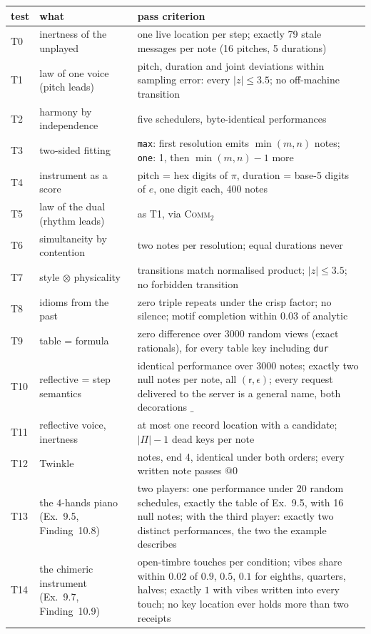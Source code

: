 \documentclass[11pt,a4paper]{article}
\theoremstyle{definition}
\theoremstyle{remark}
\newcommand{\Pit}{\Pi}
\newcommand{\nulld}{\epsilon}
\newcommand{\rest}{\mathsf{r}}
\newcommand{\wild}{\_}
\begin{document}
\begin{center}
\small
\begin{tabular}{@{}l>{\raggedright\arraybackslash}p{4.9cm}>{\raggedright\arraybackslash}p{5.6cm}@{}}
\toprule
test & what & pass criterion \\
\midrule
T0 & inertness of the unplayed & one live location per step; exactly 79 stale
  messages per note (16 pitches, 5 durations) \\
T1 & law of one voice (pitch leads) & pitch, duration and joint deviations
  within sampling error: every $|z|\le 3.5$; no off-machine transition \\
T2 & harmony by independence & five schedulers, byte-identical performances \\
T3 & two-sided fitting & \texttt{max}: first resolution emits $\min(m,n)$ notes;
  \texttt{one}: 1, then $\min(m,n)-1$ more \\
T4 & instrument as a score & pitch = hex digits of $\pi$, duration = base-5
  digits of $e$, one digit each, 400 notes \\
T5 & law of the dual (rhythm leads) & as T1, via \textsc{Comm}$_2$ \\
T6 & simultaneity by contention & two notes per resolution; equal durations
  never \\
T7 & style $\otimes$ physicality & transitions match normalised product;
  $|z|\le 3.5$; no forbidden transition \\
T8 & idioms from the past & zero triple repeats under the crisp factor; no
  silence; motif completion within $0.03$ of analytic \\
T9 & table = formula & zero difference over 3000 random views (exact
  rationals), for every table key including \texttt{dur} \\
T10 & reflective = step semantics & identical performance over 3000 notes;
  exactly two null notes per note, all $(\rest,\nulld)$; every request delivered
  to the server is a general name, both decorations $\wild$ \\
T11 & reflective voice, inertness & at most one record location with a
  candidate; $|\Pit|-1$ dead keys per note \\
T12 & Twinkle & 22 notes, end 4, identical under both orders; every written
  note passes $@0$ \\
T13 & the $4$-hands piano (Ex.~9.5, Finding~10.8) & two players: one
  performance under 20 random schedules, exactly the table of Ex.~9.5, with 16
  null notes; with the third player: exactly two distinct performances, the two
  the example describes \\
T14 & the chimeric instrument (Ex.~9.7, Finding~10.9) & 4500 open-timbre
  touches per condition; vibes share within $0.02$ of $0.9$, $0.5$, $0.1$ for
  eighths, quarters, halves; exactly $1$ with vibes written into every touch; no
  key location ever holds more than two receipts \\
\bottomrule
\end{tabular}
\end{center}
\end{document}
